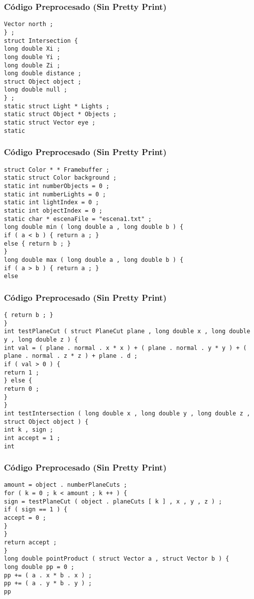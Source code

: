 \documentclass{beamer}
\begin{document}
\begin{frame}[fragile]
\frametitle{C\'odigo Preprocesado (Sin Pretty Print)}
\begin{lstlisting}[style=CStyle]
Vector north ; 
} ; 
struct Intersection { 
long double Xi ; 
long double Yi ; 
long double Zi ; 
long double distance ; 
struct Object object ; 
long double null ; 
} ; 
static struct Light * Lights ; 
static struct Object * Objects ; 
static struct Vector eye ; 
static \end{lstlisting}
\end{frame}
\begin{frame}[fragile]
\frametitle{C\'odigo Preprocesado (Sin Pretty Print)}
\begin{lstlisting}[style=CStyle]
struct Color * * Framebuffer ; 
static struct Color background ; 
static int numberObjects = 0 ; 
static int numberLights = 0 ; 
static int lightIndex = 0 ; 
static int objectIndex = 0 ; 
static char * escenaFile = "escena1.txt" ; 
long double min ( long double a , long double b ) { 
if ( a < b ) { return a ; } 
else { return b ; } 
} 
long double max ( long double a , long double b ) { 
if ( a > b ) { return a ; } 
else \end{lstlisting}
\end{frame}
\begin{frame}[fragile]
\frametitle{C\'odigo Preprocesado (Sin Pretty Print)}
\begin{lstlisting}[style=CStyle]
{ return b ; } 
} 
int testPlaneCut ( struct PlaneCut plane , long double x , long double y , long double z ) { 
int val = ( plane . normal . x * x ) + ( plane . normal . y * y ) + ( plane . normal . z * z ) + plane . d ; 
if ( val > 0 ) { 
return 1 ; 
} else { 
return 0 ; 
} 
} 
int testIntersection ( long double x , long double y , long double z , struct Object object ) { 
int k , sign ; 
int accept = 1 ; 
int \end{lstlisting}
\end{frame}
\begin{frame}[fragile]
\frametitle{C\'odigo Preprocesado (Sin Pretty Print)}
\begin{lstlisting}[style=CStyle]
amount = object . numberPlaneCuts ; 
for ( k = 0 ; k < amount ; k ++ ) { 
sign = testPlaneCut ( object . planeCuts [ k ] , x , y , z ) ; 
if ( sign == 1 ) { 
accept = 0 ; 
} 
} 
return accept ; 
} 
long double pointProduct ( struct Vector a , struct Vector b ) { 
long double pp = 0 ; 
pp += ( a . x * b . x ) ; 
pp += ( a . y * b . y ) ; 
pp \end{lstlisting}
\end{frame}
\end{document}
